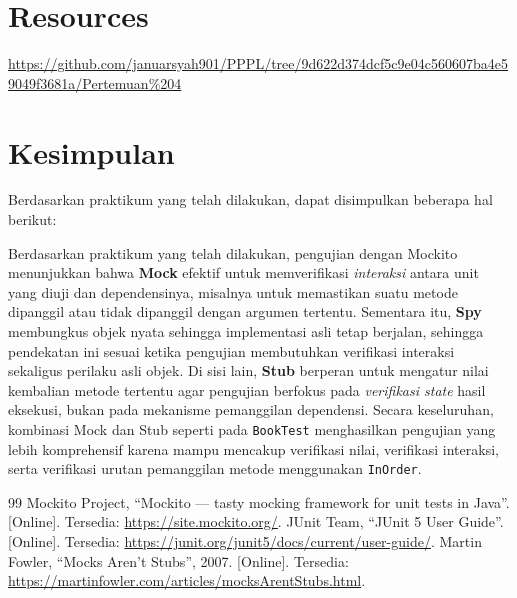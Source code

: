 \documentclass[a4paper,oneside,12pt]{report}
\renewcommand{\bibname}{Daftar Pustaka}
\begin{document}
\clearpage

\chapter{Resources}

\begin{center}
    \url{https://github.com/januarsyah901/PPPL/tree/9d622d374dcf5c9e04c560607ba4e59049f3681a/Pertemuan%204}
\end{center}

\clearpage

\chapter{Kesimpulan}

Berdasarkan praktikum yang telah dilakukan, dapat disimpulkan beberapa hal berikut:

Berdasarkan praktikum yang telah dilakukan, pengujian dengan Mockito menunjukkan bahwa \textbf{Mock} efektif untuk memverifikasi \textit{interaksi} antara unit yang diuji dan dependensinya, misalnya untuk memastikan suatu metode dipanggil atau tidak dipanggil dengan argumen tertentu. Sementara itu, \textbf{Spy} membungkus objek nyata sehingga implementasi asli tetap berjalan, sehingga pendekatan ini sesuai ketika pengujian membutuhkan verifikasi interaksi sekaligus perilaku asli objek. Di sisi lain, \textbf{Stub} berperan untuk mengatur nilai kembalian metode tertentu agar pengujian berfokus pada \textit{verifikasi state} hasil eksekusi, bukan pada mekanisme pemanggilan dependensi. Secara keseluruhan, kombinasi Mock dan Stub seperti pada \texttt{BookTest} menghasilkan pengujian yang lebih komprehensif karena mampu mencakup verifikasi nilai, verifikasi interaksi, serta verifikasi urutan pemanggilan metode menggunakan \texttt{InOrder}.

\clearpage
{}
\renewcommand{\bibname}{Daftar Pustaka}

\begin{thebibliography}{99}
     Mockito Project, ``Mockito --- tasty mocking framework for unit tests in Java''. [Online]. Tersedia: \url{https://site.mockito.org/}.
     JUnit Team, ``JUnit 5 User Guide''. [Online]. Tersedia: \url{https://junit.org/junit5/docs/current/user-guide/}.
     Martin Fowler, ``Mocks Aren't Stubs'', 2007. [Online]. Tersedia: \url{https://martinfowler.com/articles/mocksArentStubs.html}.
\end{thebibliography}
\end{document}
